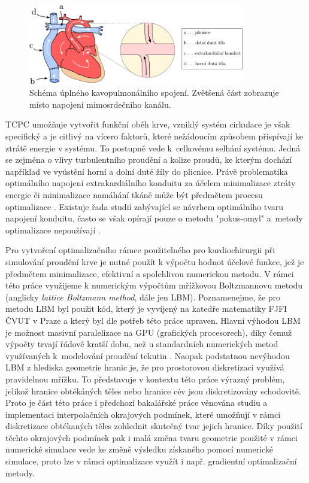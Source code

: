 \begin{figure}[h]
	\centering
	\includegraphics[width=0.84\textwidth]{Images/srdce-zoom.pdf}
	\caption{Schéma úplného kavopulmonálního spojení. Zvětšená část zobrazuje místo napojení mimosrdečního kanálu.}
	\label{fig:tcpc}
	\vspace{-2mm}
\end{figure}

TCPC umožňuje vytvořit funkční oběh krve, vzniklý systém cirkulace je však specifický a je citlivý na vícero faktorů, které nežádoucím způsobem přispívají ke ztrátě energie v systému. To postupně vede k~celkovému selhání systému. Jedná se zejména o vlivy turbulentního proudění a kolize proudů, ke kterým dochází například ve vyústění horní a dolní duté žíly do plicnice. Právě problematika optimálního napojení extrakardiálního konduitu za účelem minimalizace ztráty energie či minimalizace namáhání tkáně může být předmětem procesu optimalizace \cite{Chaloup, vanBake, Wang}. Existuje řada studií zabývající se návrhem optimálního tvaru napojení konduitu, často se však opírají pouze o metodu "pokus-omyl" a~metody optimalizace nepoužívají \cite{Rijnberg2018, Porfiryev2020, Tang2014}.

Pro vytvoření optimalizačního rámce použitelného pro kardiochirurgii při simulování proudění krve je nutné použít k výpočtu hodnot účelové funkce, jež je předmětem minimalizace, efektivní a spolehlivou numerickou metodu. V rámci této práce využijeme k numerickým výpočtům mřížkovou Boltzmannovu metodu (anglicky \textit{lattice Boltzmann method}, dále jen LBM). Poznamenejme, že pro metodu LBM byl použit kód, který je vyvíjený na katedře matematiky FJFI ČVUT v Praze a který byl dle potřeb této práce upraven. Hlavní výhodou LBM je možnost masivní paralelizace na GPU (grafických procesorech), díky čemuž výpočty trvají řádově kratší dobu, než u standardních numerických metod využívaných k~modelování proudění tekutin \cite{PE, Kruger}. Naopak podstatnou nevýhodou LBM z hlediska geometrie hranic je, že pro prostorovou diskretizaci využívá pravidelnou mřížku. To představuje v kontextu této práce výrazný problém, jelikož hranice obtékáných těles nebo hranice cév jsou diskretizovány schodovitě. Proto je část této práce i předchozí bakalářské práce \cite{JB} věnována studiu a implementaci interpolačních okrajových podmínek, které umožňují v rámci diskretizace obtékaných těles zohlednit skutečný tvar jejich hranice. Díky použití těchto okrajových podmínek pak i malá změna tvaru geometrie použité v rámci numerické simulace vede ke změně výsledku získaného pomocí numerické simulace, proto lze v rámci optimalizace využít i např. gradientní optimalizační metody.

